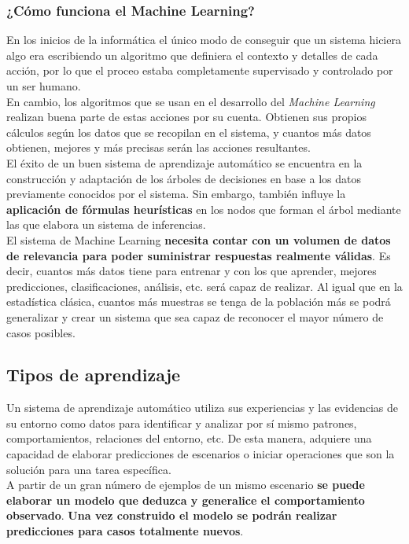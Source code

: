 \subsubsection{¿Cómo funciona el Machine Learning?}
En los inicios de la informática el único modo de conseguir que un sistema hiciera algo era escribiendo un algoritmo que definiera el contexto y detalles de cada acción, por lo que el proceo estaba completamente supervisado y controlado por un ser humano. \\

En cambio, los algoritmos que se usan en el desarrollo del \textit{Machine Learning} realizan buena parte de estas acciones por su cuenta. Obtienen sus propios cálculos según los datos que se recopilan en el sistema, y cuantos más datos obtienen, mejores y más precisas serán las acciones resultantes. \\

El éxito de un buen sistema de aprendizaje automático se encuentra en la construcción y adaptación de los árboles de decisiones en base a los datos previamente conocidos por el sistema. Sin embargo, también influye la \textbf{aplicación de fórmulas heurísticas} en los nodos que forman el árbol mediante las que elabora un sistema de inferencias. \\

El sistema de Machine Learning \textbf{necesita contar con un volumen de datos de relevancia para poder suministrar respuestas realmente válidas}. Es decir, cuantos más datos tiene para entrenar y con los que aprender, mejores predicciones, clasificaciones, análisis, etc. será capaz de realizar. Al igual que en la estadística clásica, cuantos más muestras se tenga de la población más se podrá generalizar y crear un sistema que sea capaz de reconocer el mayor número de casos posibles. 

\subsection{Tipos de aprendizaje}

Un sistema de aprendizaje automático utiliza sus experiencias y las evidencias de su entorno como datos para identificar y analizar por sí mismo patrones, comportamientos, relaciones del entorno, etc. De esta manera, adquiere una capacidad de elaborar predicciones de escenarios o iniciar operaciones que son la solución para una tarea específica. \\

A partir de un gran número de ejemplos de un mismo escenario \textbf{se puede elaborar un modelo que deduzca y generalice el comportamiento observado}. \textbf{Una vez construido el modelo se podrán realizar predicciones para casos totalmente nuevos}. \\

